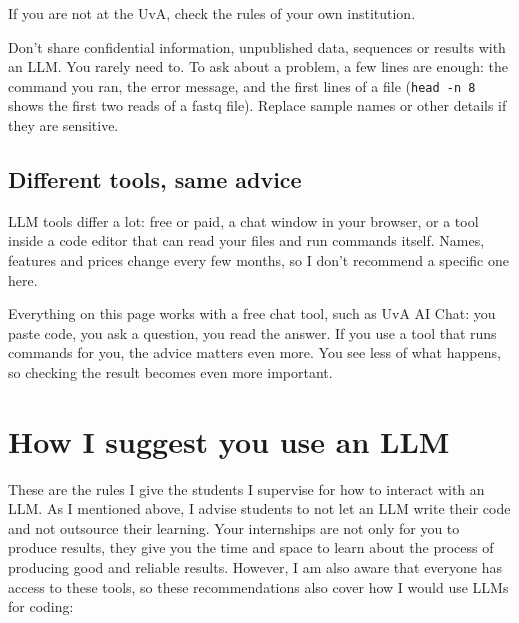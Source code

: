 \documentclass[
  letterpaper,
  DIV=11,
  numbers=noendperiod]{scrreprt}
\begin{document}
If you are not at the UvA, check the rules of your own institution.

\begin{tcolorbox}[enhanced jigsaw, title=\textcolor{quarto-callout-important-color}{\faExclamation}\hspace{0.5em}{Important: Don't paste your data into an LLM}, rightrule=.15mm, titlerule=0mm, colframe=quarto-callout-important-color-frame, toprule=.15mm, leftrule=.75mm, colbacktitle=quarto-callout-important-color!10!white, bottomtitle=1mm, toptitle=1mm, arc=.35mm, opacitybacktitle=0.6, left=2mm, bottomrule=.15mm, breakable, opacityback=0, colback=white, coltitle=black]

Don't share confidential information, unpublished data, sequences or
results with an LLM. You rarely need to. To ask about a problem, a few
lines are enough: the command you ran, the error message, and the first
lines of a file (\texttt{head\ -n\ 8} shows the first two reads of a
fastq file). Replace sample names or other details if they are
sensitive.

\end{tcolorbox}

\subsection{Different tools, same
advice}\label{different-tools-same-advice}

LLM tools differ a lot: free or paid, a chat window in your browser, or
a tool inside a code editor that can read your files and run commands
itself. Names, features and prices change every few months, so I don't
recommend a specific one here.

Everything on this page works with a free chat tool, such as UvA AI
Chat: you paste code, you ask a question, you read the answer. If you
use a tool that runs commands for you, the advice matters even more. You
see less of what happens, so checking the result becomes even more
important.

\section{How I suggest you use an
LLM}\label{how-i-suggest-you-use-an-llm}

These are the rules I give the students I supervise for how to interact
with an LLM. As I mentioned above, I advise students to not let an LLM
write their code and not outsource their learning. Your internships are
not only for you to produce results, they give you the time and space to
learn about the process of producing good and reliable results. However,
I am also aware that everyone has access to these tools, so these
recommendations also cover how I would use LLMs for coding:
\end{document}
